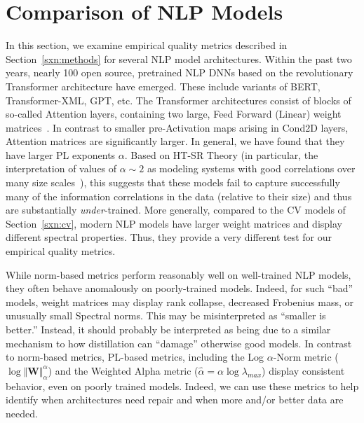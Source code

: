 \vspace{-1mm}
\section{Comparison of NLP Models}
\label{sxn:nlp}

In this section, we examine empirical quality metrics described in Section~\ref{sxn:methods} for several NLP model architectures.
%
Within the past two years, nearly 100 open source, pretrained NLP DNNs based on the revolutionary Transformer architecture have emerged.
These include variants of BERT, Transformer-XML, GPT, etc.
%
The Transformer architectures consist of blocks of so-called Attention layers, containing two large, Feed Forward (Linear) weight matrices~\cite{Attn2017}. 
In contrast to smaller pre-Activation maps arising in Cond2D layers, Attention matrices are significantly larger.
In general, we have found that they have larger PL exponents $\alpha$.
Based on HT-SR Theory
(in particular, the interpretation of values of $\alpha \sim 2$ as modeling systems with good correlations over many size scales~\cite{BouchaudPotters03, SornetteBook}), 
this suggests that these models fail to capture successfully many of the information correlations in the data (relative to their size) and thus are substantially \emph{under}-trained.
%
More generally, compared to the CV models of Section~\ref{sxn:cv},
modern NLP models have larger weight matrices and display different spectral properties.
Thus, they provide a very different test for our empirical quality metrics.

While norm-based metrics perform reasonably well on well-trained NLP models, they often behave anomalously on poorly-trained models.
Indeed, for such ``bad'' models, weight matrices may display rank collapse, decreased Frobenius mass, or unusually small Spectral norms.
This may be misinterpreted as ``smaller is better.'' 
Instead, it should probably be interpreted as being due to a similar mechanism to how distillation can ``damage'' otherwise good models.
In contrast to norm-based metrics, PL-based metrics, including the Log $\alpha$-Norm metric ($\log\Vert\mathbf{W}\Vert_{\alpha}^{\alpha}$) and the Weighted Alpha metric ($\hat\alpha =\alpha\log\lambda_{max} $) display consistent behavior, even on poorly trained models.
Indeed, we can use these metrics to help identify when architectures need repair and when more and/or better data are needed.


